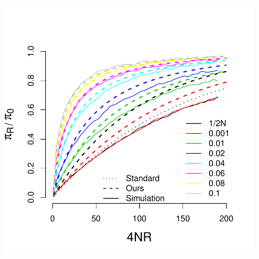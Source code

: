 \documentclass[a4paper,10pt]{article}
\begin{document}
\begin{figure}
	\includegraphics[width = \textwidth]{../Paper_Figures/pi_density.pdf}
\end{figure}
\end{document}
